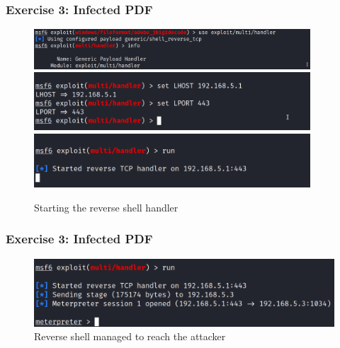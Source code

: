 \documentclass[handout]{beamer}
\begin{document}
\begin{frame}
    \frametitle{Exercise 3: Infected PDF}
    \begin{figure}
        \centering
        \includegraphics[width=0.92\textwidth]{../drawable/exercise_3_screenshots/generic_payload_handler.png}
        \includegraphics[width=0.92\textwidth]{../drawable/exercise_3_screenshots/set_handler_parameters.png}
        \includegraphics[width=0.92\textwidth]{../drawable/exercise_3_screenshots/handler_listening.png}
        \caption{Starting the reverse shell handler}
    \end{figure}
\end{frame}

\begin{frame}
    \frametitle{Exercise 3: Infected PDF}
    \begin{figure}
        \centering
        \includegraphics[width=\textwidth]{../drawable/exercise_3_screenshots/meterpreter_opened.png}
        \caption{Reverse shell managed to reach the attacker}
    \end{figure}
\end{frame}
\end{document}
